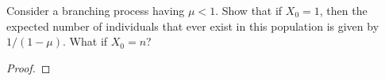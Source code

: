 \begin{problem}{4.64}
  Consider a branching process having $\mu < 1$. Show that if $X_0 = 1$, then the expected
  number of individuals that ever exist in this population is given by $1/(1-\mu)$.
  What if $X_0 = n$?
\end{problem}

\begin{proof}
\end{proof}
\newpage
